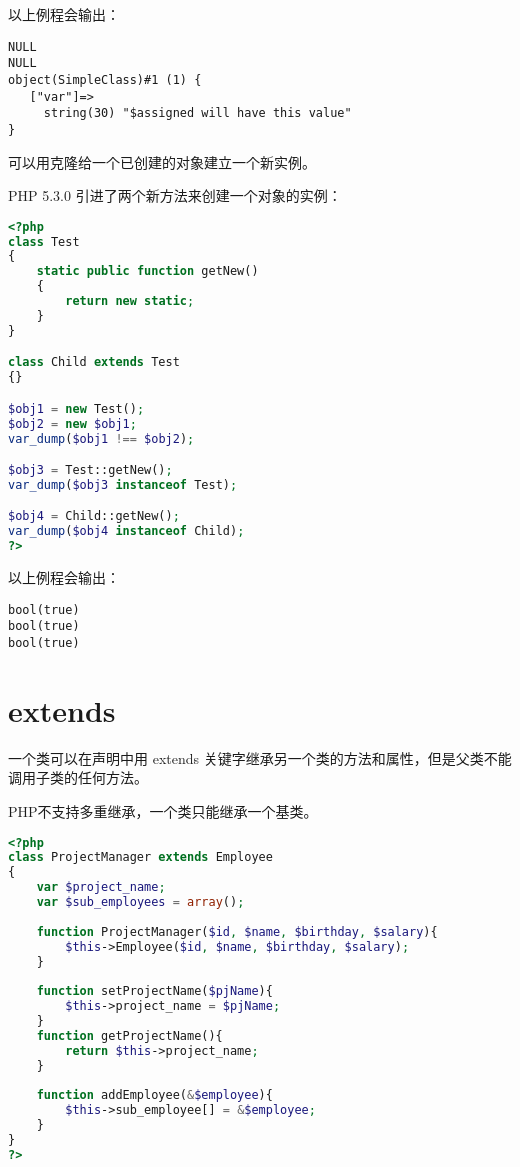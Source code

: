 以上例程会输出：

\begin{verbatim}
NULL
NULL
object(SimpleClass)#1 (1) {
   ["var"]=>
     string(30) "$assigned will have this value"
}
\end{verbatim}

可以用克隆给一个已创建的对象建立一个新实例。

PHP 5.3.0 引进了两个新方法来创建一个对象的实例：





\begin{lstlisting}[language=PHP]
<?php
class Test
{
    static public function getNew()
    {
        return new static;
    }
}

class Child extends Test
{}

$obj1 = new Test();
$obj2 = new $obj1;
var_dump($obj1 !== $obj2);

$obj3 = Test::getNew();
var_dump($obj3 instanceof Test);

$obj4 = Child::getNew();
var_dump($obj4 instanceof Child);
?>
\end{lstlisting}

以上例程会输出：

\begin{verbatim}
bool(true)
bool(true)
bool(true)
\end{verbatim}


\section{extends}

一个类可以在声明中用 extends 关键字继承另一个类的方法和属性，但是父类不能调用子类的任何方法。

PHP不支持多重继承，一个类只能继承一个基类。


\begin{lstlisting}[language=PHP]
<?php
class ProjectManager extends Employee
{
	var $project_name;
	var $sub_employees = array();
	
	function ProjectManager($id, $name, $birthday, $salary){
		$this->Employee($id, $name, $birthday, $salary);
	}
	
	function setProjectName($pjName){
		$this->project_name = $pjName;
	}
	function getProjectName(){
		return $this->project_name;
	}
	
	function addEmployee(&$employee){
		$this->sub_employee[] = &$employee;
	}
}
?>
\end{lstlisting}

